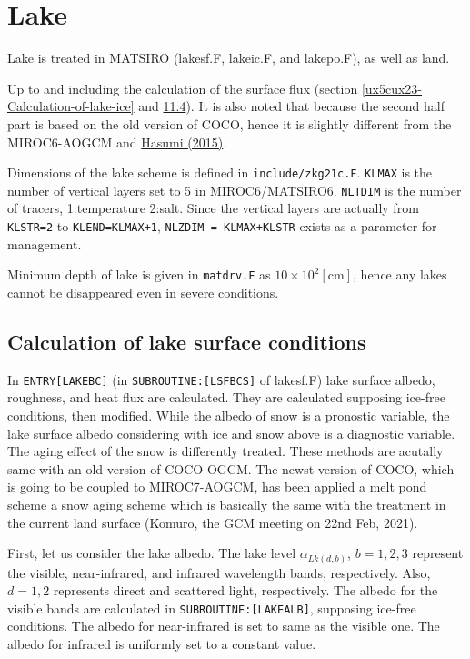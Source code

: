 \hypertarget{lake}{%
\section{Lake}\label{lake}}

Lake is treated in MATSIRO (lakesf.F, lakeic.F, and lakepo.F), as well
as land.

Up to and including the calculation of the surface flux (section
\ref{ux5cux23-Calculation-of-lake-ice} and
\href{}{11.4}). It is also noted that because the second half part is
based on the old version of COCO, hence it is slightly different from
the MIROC6-AOGCM and
\href{https://ccsr.aori.u-tokyo.ac.jp/~hasumi/COCO/coco4.pdf}{Hasumi
(2015)}.

Dimensions of the lake scheme is defined in \texttt{include/zkg21c.F}.
\texttt{KLMAX} is the number of vertical layers set to 5 in
MIROC6/MATSIRO6. \texttt{NLTDIM} is the number of tracers, 1:temperature
2:salt. Since the vertical layers are actually from \texttt{KLSTR=2} to
\texttt{KLEND=KLMAX+1}, \texttt{NLZDIM\ =\ KLMAX+KLSTR} exists as a
parameter for management.

Minimum depth of lake is given in \texttt{matdrv.F} as
\(10 \times 10^2 \mathrm{[cm]}\), hence any lakes cannot be disappeared
even in severe conditions.

\hypertarget{calculation-of-lake-surface-conditions}{%
\subsection{Calculation of lake surface
conditions}\label{calculation-of-lake-surface-conditions}}

In \texttt{ENTRY{[}LAKEBC{]}} (in \texttt{SUBROUTINE:{[}LSFBCS{]}} of
lakesf.F) lake surface albedo, roughness, and heat flux are calculated.
They are calculated supposing ice-free conditions, then modified. While
the albedo of snow is a pronostic variable, the lake surface albedo
considering with ice and snow above is a diagnostic variable. The aging
effect of the snow is differently treated. These methods are acutally
same with an old version of COCO-OGCM. The newst version of COCO, which
is going to be coupled to MIROC7-AOGCM, has been applied a melt pond
scheme a snow aging scheme which is basically the same with the
treatment in the current land surface (Komuro, the GCM meeting on 22nd
Feb, 2021).

First, let us consider the lake albedo. The lake level
\(\alpha_{Lk(d,b)}\), \(b=1,2,3\) represent the visible, near-infrared,
and infrared wavelength bands, respectively. Also, \(d=1,2\) represents
direct and scattered light, respectively. The albedo for the visible
bands are calculated in \texttt{SUBROUTINE:{[}LAKEALB{]}}, supposing
ice-free conditions. The albedo for near-infrared is set to same as the
visible one. The albedo for infrared is uniformly set to a constant
value.

